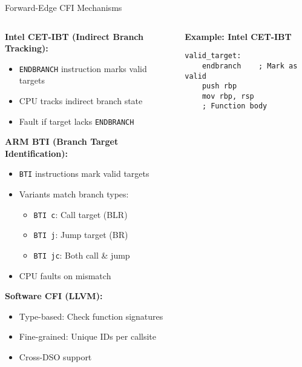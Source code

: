\documentclass[aspectratio=169,12pt]{beamer}
\begin{document}
\begin{frame}[fragile]{Forward-Edge CFI Mechanisms}
    \begin{columns}
        \begin{column}{0.5\textwidth}
            \textbf{Intel CET-IBT (Indirect Branch Tracking):}
            \begin{itemize}
                \item \texttt{ENDBRANCH} instruction marks valid targets
                \item CPU tracks indirect branch state
                \item Fault if target lacks \texttt{ENDBRANCH}
            \end{itemize}
            
            \vspace{0.3cm}
            \textbf{ARM BTI (Branch Target Identification):}
            \begin{itemize}
                \item \texttt{BTI} instructions mark valid targets
                \item Variants match branch types:
                \begin{itemize}
                    \item \texttt{BTI c}: Call target (BLR)
                    \item \texttt{BTI j}: Jump target (BR)
                    \item \texttt{BTI jc}: Both call \& jump
                \end{itemize}
                \item CPU faults on mismatch
            \end{itemize}
            
            \vspace{0.3cm}
            \textbf{Software CFI (LLVM):}
            \begin{itemize}
                \item Type-based: Check function signatures
                \item Fine-grained: Unique IDs per callsite
                \item Cross-DSO support
            \end{itemize}
        \end{column}
        \begin{column}{0.5\textwidth}
            \begin{tcolorbox}[colback=gray!10]
                \small
                \textbf{Example: Intel CET-IBT}
                \begin{verbatim}
valid_target:
    endbranch    ; Mark as valid
    push rbp
    mov rbp, rsp
    ; Function body
    

\end{verbatim}
\end{tcolorbox}
\end{column}
\end{columns}
\end{frame}
\end{document}
